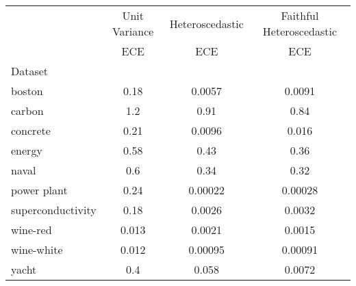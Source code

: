 \begin{tabular}{l|c|c|c}
\toprule
{} & {Unit Variance} & {Heteroscedastic} & {Faithful Heteroscedastic} \\
{} & {ECE} & {ECE} & {ECE} \\
{Dataset} & {} & {} & {} \\
\midrule
boston & 0.18 & 0.0057 & 0.0091 \\
carbon & 1.2 & 0.91 & 0.84 \\
concrete & 0.21 & 0.0096 & 0.016 \\
energy & 0.58 & 0.43 & 0.36 \\
naval & 0.6 & 0.34 & 0.32 \\
power plant & 0.24 & 0.00022 & 0.00028 \\
superconductivity & 0.18 & 0.0026 & 0.0032 \\
wine-red & 0.013 & 0.0021 & 0.0015 \\
wine-white & 0.012 & 0.00095 & 0.00091 \\
yacht & 0.4 & 0.058 & 0.0072 \\
\bottomrule
\end{tabular}
